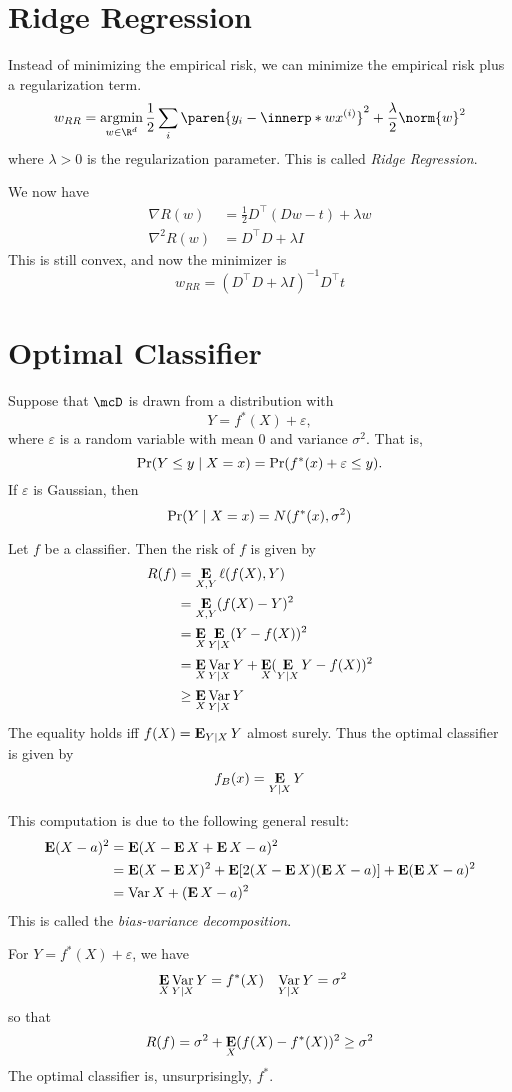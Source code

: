 \section{Ridge Regression} \label{sec:regression:ridge}
Instead of minimizing the empirical risk, we can minimize the empirical risk
plus a regularization term.
\[
    w_{RR} = \argmin_{w \in \R^d}
                \frac12 \sum_i \paren{y_i - \innerp* w {x^{(i)}}}^2
                + \frac{\lambda}{2} \norm{w}^2
\] where $\lambda > 0$ is the regularization parameter.
This is called \emph{Ridge Regression}.

We now have \begin{align*}
    \nabla R(w) &= \frac12 D^\top (Dw - t) + \lambda w \\
    \nabla^2 R(w) &= D^\top D + \lambda I
\end{align*}
This is still convex, and now the minimizer is \[
    \boxed{w_{RR} = (D^\top D + \lambda I)^{-1} D^\top t}
\]

\section{Optimal Classifier} \label{sec:regression:optimal}
Suppose that $\mcD$ is drawn from a distribution with \[
    Y = f^*(X) + \varepsilon,
\] where $\varepsilon$ is a random variable with mean $0$ and variance
$\sigma^2$.
That is, \[
    \Pr(Y \le y \mid X = x) = \Pr(f^*(x) + \varepsilon \le y).
\] If $\varepsilon$ is Gaussian, then \[
    \Pr(Y \mid X = x) = N(f^*(x), \sigma^2)
\]

Let $f$ be a classifier.
Then the risk of $f$ is given by \begin{align*}
    R(f) &= \operatorname*{\textbf{E}}_{X, Y} \ell(f(X), Y) \\
    &= \operatorname*{\textbf{E}}_{X, Y} (f(X) - Y)^2 \\
    &= \operatorname*{\textbf{E}}_X \operatorname*{\textbf{E}}_{Y \mid X} (Y - f(X))^2 \\
    &= \operatorname*{\textbf{E}}_X \operatorname*{Var}_{Y \mid X} Y + \operatorname*{\textbf{E}}_X (\operatorname*{\textbf{E}}_{Y \mid X} Y - f(X))^2 \\
    &\ge \operatorname*{\textbf{E}}_X \operatorname*{Var}_{Y \mid X} Y
\end{align*}
The equality holds iff $f(X) = \operatorname*{\textbf{E}}_{Y \mid X} Y$ almost surely.
Thus the optimal classifier is given by \[
    f_B(x) = \operatorname*{\textbf{E}}_{Y \mid X} Y
\]

This computation is due to the following general result: \begin{align}
    \operatorname*{\textbf{E}} (X - a)^2 &= \operatorname*{\textbf{E}} (X - \operatorname*{\textbf{E}} X + \operatorname*{\textbf{E}} X - a)^2 \nonumber \\
    &= \operatorname*{\textbf{E}} (X - \operatorname*{\textbf{E}} X)^2 + \operatorname*{\textbf{E}} [2(X - \operatorname*{\textbf{E}} X)(\operatorname*{\textbf{E}} X - a)] + \operatorname*{\textbf{E}} (\operatorname*{\textbf{E}} X - a)^2 \nonumber \\
    &= \operatorname*{Var} X + (\operatorname*{\textbf{E}} X - a)^2 \label{eq:bias-variance}
\end{align}
This is called the \emph{bias-variance decomposition}.

For $Y = f^*(X) + \varepsilon$, we have \begin{align*}
    \operatorname*{\textbf{E}}_X \operatorname*{Var}_{Y \mid X} Y &= f^*(X) & \operatorname*{Var}_{Y \mid X} Y &= \sigma^2
\end{align*} so that \[
    R(f) = \sigma^2 + \operatorname*{\textbf{E}}_X (f(X) - f^*(X))^2 \ge \sigma^2
\] The optimal classifier is, unsurprisingly, $f^*$.
